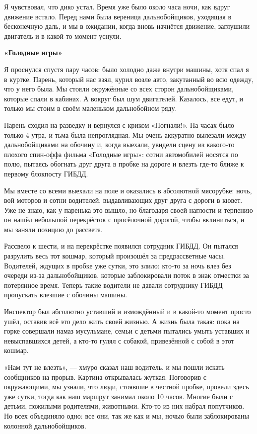 Я чувствовал, что дико устал. Время уже было около часа ночи, как вдруг движение встало. Перед нами была вереница дальнобойщиков, уходящая в бесконечную даль, и мы в ожидании, когда вновь начнётся движение, заглушили двигатель и в какой-то момент уснули.


\textbf{«Голодные игры»}

Я проснулся спустя пару часов: было холодно даже внутри машины, хотя спал я в куртке. Парень, который нас взял, курил возле авто, закутанный во всю одежду, что у него была. Мы стояли окружённые со всех сторон дальнобойщиками, которые спали в кабинах. А вокруг был шум двигателей. Казалось, все едут, и только мы стоим в своём маленьком дальнобойном ряду.

Парень сходил на разведку и вернулся с криком «Погнали!». На часах было только 4 утра, и тьма была непроглядная. Мы очень аккуратно вылезали между дальнобойщиками на обочину и, когда выехали, увидели сцену из какого-то плохого спин-оффа фильма «Голодные игры»: сотни автомобилей носятся по полю, пытаясь обогнать друг друга в пробке на дороге и влезть где-то ближе к первому блокпосту ГИБДД.

Мы вместе со всеми выехали на поле и оказались в абсолютной мясорубке: ночь, вой моторов и сотни водителей, выдавливающих друг друга с дороги в кювет. Уже не знаю, как у паренька это вышло, но благодаря своей наглости и терпению он нашёл небольшой перекрёсток с просёлочной дорогой, чтобы вклиниться, и мы заняли позицию до рассвета.


Рассвело к шести, и на перекрёстке появился сотрудник ГИБДД. Он пытался разрулить весь тот кошмар, который произошёл за предрассветные часы. Водителей, ждущих в пробке уже сутки, это злило: кто-то за ночь влез без очереди из-за дальнобойщиков, которые заблокировали поток в знак отместки за потерянное время. Теперь такие водители не давали сотруднику ГИБДД пропускать влезшие с обочины машины.

Инспектор был абсолютно уставший и измождённый и в какой-то момент просто ушёл, оставив всё это дело жить своей жизнью. А жизнь была такая: пока на горке совершали намаз мусульмане, семьи с детьми пытались умыть уставших и невыспавшихся детей, а кто-то гулял с собакой, привезённой с собой в этот кошмар.

«Нам тут не влезть», — хмуро сказал наш водитель, и мы пошли искать сообщников на прорыв. Картина открывалась жуткая. Поговорив с окружающими, мы узнали, что люди, стоявшие в честной пробке, провели здесь уже сутки, тогда как наш маршрут занимал около 10 часов. Многие были с детьми, пожилыми родителями, животными. Кто-то из них набрал попутчиков. Но всех объединяло одно: все они, так же как и мы, ночью были заблокированы колонной дальнобойщиков.

